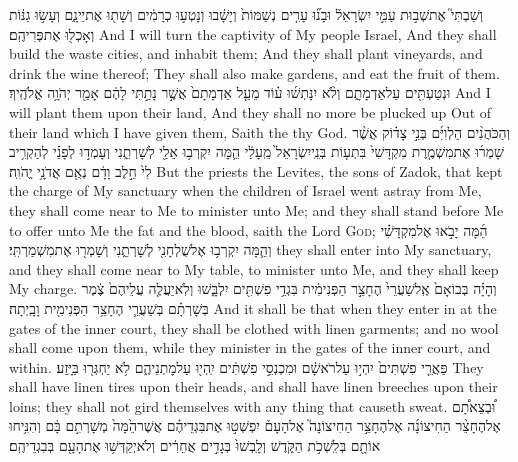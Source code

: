 {וְשַׁבְתִּי֮ אֶת\maqqaf שְׁב֣וּת עַמִּ֣י יִשְׂרָאֵל֒ וּבָנ֞וּ עָרִ֤ים נְשַׁמּוֹת֙ וְיָשָׁ֔בוּ וְנָטְע֣וּ כְרָמִ֔ים וְשָׁת֖וּ אֶת\maqqaf יֵינָ֑ם וְעָשׂ֣וּ גַנּ֔וֹת וְאָכְל֖וּ אֶת\maqqaf פְּרִיהֶֽם׃}
{And I will turn the captivity of My people Israel, And they shall build the waste cities, and inhabit them; And they shall plant vineyards, and drink the wine thereof; They shall also make gardens, and eat the fruit of them.}
{וּנְטַעְתִּ֖ים עַל\maqqaf אַדְמָתָ֑ם וְלֹ֨א יִנָּתְשׁ֜וּ ע֗וֹד מֵעַ֤ל אַדְמָתָם֙ אֲשֶׁ֣ר נָתַ֣תִּי לָהֶ֔ם אָמַ֖ר יְהֹוָ֥ה אֱלֹהֶֽיךָ׃}
{And I will plant them upon their land, And they shall no more be plucked up Out of their land which I have given them, Saith the \lord\space thy God.}
\label{haft_31}
\setcounter{chap}{44}
\setcounter{verse}{15}
{וְהַכֹּהֲנִ֨ים הַלְוִיִּ֜ם בְּנֵ֣י צָד֗וֹק אֲשֶׁ֨ר שָׁמְר֜וּ אֶת\maqqaf מִשְׁמֶ֤רֶת מִקְדָּשִׁי֙ בִּתְע֤וֹת בְּנֵֽי\maqqaf יִשְׂרָאֵל֙ מֵֽעָלַ֔י הֵ֛מָּה יִקְרְב֥וּ אֵלַ֖י לְשָׁרְתֵ֑נִי וְעָמְד֣וּ לְפָנַ֗י לְהַקְרִ֥יב לִי֙ חֵ֣לֶב וָדָ֔ם נְאֻ֖ם אֲדֹנָ֥י יֱהֹוִֽה׃}
{But the priests the Levites, the sons of Zadok, that kept the charge of My sanctuary when the children of Israel went astray from Me, they shall come near to Me to minister unto Me; and they shall stand before Me to offer unto Me the fat and the blood, saith the Lord \textsc{God};}
{הֵ֜מָּה יָבֹ֣אוּ אֶל\maqqaf מִקְדָּשִׁ֗י וְהֵ֛מָּה יִקְרְב֥וּ אֶל\maqqaf שֻׁלְחָנִ֖י לְשָׁרְתֵ֑נִי וְשָׁמְר֖וּ אֶת\maqqaf מִשְׁמַרְתִּֽי׃}
{they shall enter into My sanctuary, and they shall come near to My table, to minister unto Me, and they shall keep My charge.}
{וְהָיָ֗ה בְּבוֹאָם֙ אֶֽל\maqqaf שַׁעֲרֵי֙ הֶחָצֵ֣ר הַפְּנִימִ֔ית בִּגְדֵ֥י פִשְׁתִּ֖ים יִלְבָּ֑שׁוּ וְלֹֽא\maqqaf יַעֲלֶ֤ה עֲלֵיהֶם֙ צֶ֔מֶר בְּשָׁרְתָ֗ם בְּשַׁעֲרֵ֛י הֶחָצֵ֥ר הַפְּנִימִ֖ית וָבָֽיְתָה׃}
{And it shall be that when they enter in at the gates of the inner court, they shall be clothed with linen garments; and no wool shall come upon them, while they minister in the gates of the inner court, and within.}
{פַּאֲרֵ֤י פִשְׁתִּים֙ יִהְי֣וּ עַל\maqqaf רֹאשָׁ֔ם וּמִכְנְסֵ֣י פִשְׁתִּ֔ים יִֽהְי֖וּ עַל\maqqaf מׇתְנֵיהֶ֑ם לֹ֥א יַחְגְּר֖וּ בַּיָּֽזַע׃}
{They shall have linen tires upon their heads, and shall have linen breeches upon their loins; they shall not gird themselves with any thing that causeth sweat.}
{וּ֠בְצֵאתָ֠ם אֶל\maqqaf הֶחָצֵ֨ר הַחִיצוֹנָ֜ה אֶל\maqqaf הֶחָצֵ֣ר הַחִיצוֹנָה֮ אֶל\maqqaf הָעָם֒ יִפְשְׁט֣וּ אֶת\maqqaf בִּגְדֵיהֶ֗ם אֲשֶׁר\maqqaf הֵ֙מָּה֙ מְשָׁרְתִ֣ם בָּ֔ם וְהִנִּ֥יחוּ אוֹתָ֖ם בְּלִֽשְׁכֹ֣ת הַקֹּ֑דֶשׁ וְלָֽבְשׁוּ֙ בְּגָדִ֣ים אֲחֵרִ֔ים וְלֹא\maqqaf יְקַדְּשׁ֥וּ אֶת\maqqaf הָעָ֖ם בְּבִגְדֵיהֶֽם׃}
